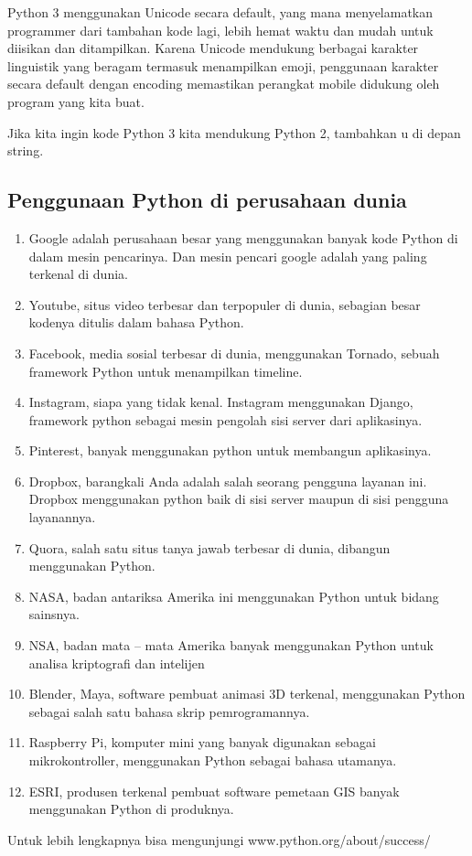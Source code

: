 Python 3 menggunakan Unicode secara default, yang mana menyelamatkan programmer dari tambahan kode lagi, lebih hemat waktu dan mudah untuk diisikan dan ditampilkan. Karena Unicode mendukung berbagai karakter linguistik yang beragam termasuk menampilkan emoji, penggunaan karakter secara default dengan encoding memastikan perangkat mobile didukung oleh program yang kita buat.

Jika kita ingin kode Python 3 kita mendukung Python 2, tambahkan u di depan string.

\subsection{Penggunaan Python di perusahaan dunia}
\begin{enumerate}
  \item Google adalah perusahaan besar yang menggunakan banyak kode Python di dalam mesin pencarinya. Dan mesin pencari google adalah yang paling terkenal di dunia.
  \item Youtube, situs video terbesar dan terpopuler di dunia, sebagian besar kodenya ditulis dalam bahasa Python.
  \item Facebook, media sosial terbesar di dunia, menggunakan Tornado, sebuah framework Python untuk menampilkan timeline.
  \item Instagram, siapa yang tidak kenal. Instagram menggunakan Django, framework python sebagai mesin pengolah sisi server dari aplikasinya.
  \item Pinterest, banyak menggunakan python untuk membangun aplikasinya.
  \item Dropbox, barangkali Anda adalah salah seorang pengguna layanan ini. Dropbox menggunakan python baik di sisi server maupun di sisi pengguna layanannya.
  \item Quora, salah satu situs tanya jawab terbesar di dunia, dibangun menggunakan Python.
  \item NASA, badan antariksa Amerika ini menggunakan Python untuk bidang sainsnya.
  \item NSA, badan mata – mata Amerika banyak menggunakan Python untuk analisa kriptografi dan intelijen
  \item Blender, Maya, software pembuat animasi 3D terkenal, menggunakan Python sebagai salah satu bahasa skrip pemrogramannya.
  \item Raspberry Pi, komputer mini yang banyak digunakan sebagai mikrokontroller, menggunakan Python sebagai bahasa utamanya.
  \item ESRI, produsen terkenal pembuat software pemetaan GIS banyak menggunakan Python di produknya.
\end{enumerate}
Untuk lebih lengkapnya bisa mengunjungi www.python.org/about/success/



